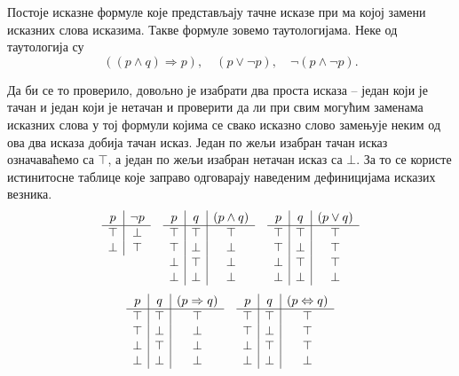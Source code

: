 \documentclass[a4paper]{book}
\begin{document}
Постоје исказне формуле које представљају тачне исказе при ма којој замени исказних слова исказима.
Такве формуле зовемо таутологијама. Неке од таутологија су
$$
((p\land q)\Rightarrow p),\quad(p\lor\lnot p),\quad\lnot(p\land\lnot p).
$$

Да би се то проверило, довољно је изабрати два проста исказа -- један који је тачан и један који
је нетачан и проверити да ли при свим могућим заменама исказних слова у тој формули којима се
свако исказно слово замењује неким од ова два исказа добија тачан исказ. Један по жељи изабран
тачан исказ означаваћемо са $\top$, а један по жељи изабран нетачан исказ са $\bot$. За то се
користе истинитосне таблице које заправо одговарају наведеним дефиницијама исказих везника.
$$
\begin{array}[t]{c|c}
p & \lnot p
\\
\hline
\top & \bot
\\
\bot & \top
\end{array}
\quad
\begin{array}[t]{c|c|c}
p & q & (p\land q)
\\
\hline
\top & \top & \top
\\
\top & \bot & \bot
\\
\bot & \top & \bot
\\
\bot & \bot & \bot
\end{array}
\quad
\begin{array}[t]{c|c|c}
p & q & (p\lor q)
\\
\hline
\top & \top & \top
\\
\top & \bot & \top
\\
\bot & \top & \top
\\
\bot & \bot & \bot
\end{array}
$$
$$
\begin{array}[t]{c|c|c}
p & q & (p\Rightarrow q)
\\
\hline
\top & \top & \top
\\
\top & \bot & \bot
\\
\bot & \top & \bot
\\
\bot & \bot & \bot
\end{array}
\quad
\begin{array}[t]{c|c|c}
p & q & (p\Leftrightarrow q)
\\
\hline
\top & \top & \top
\\
\top & \bot & \top
\\
\bot & \top & \top
\\
\bot & \bot & \bot
\end{array}	
$$
\end{document}
